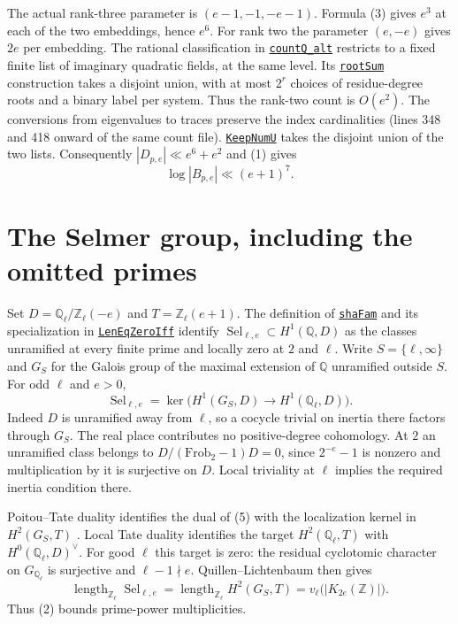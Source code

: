 \documentclass[11pt]{article}
\newcommand{\Z}{\mathbb Z}
\newcommand{\Q}{\mathbb Q}
\newcommand{\len}{\operatorname{length}}
\newcommand{\Sel}{\operatorname{Sel}}
\newcommand{\avref}[2]{\href{run:lean/src/Development/AutomorphicArithmetic/AutomorphicVarieties/#1.lean}{\texttt{#2}}}
\newcommand{\denseref}[2]{\avref{ModularityArgument/ThresholdArguments/DenseThresholdCases/#1}{#2}}
\begin{document}
The actual rank-three parameter is $(e-1,-1,-e-1)$. Formula (3) gives $e^3$
at each of the two embeddings, hence $e^6$. For rank two the parameter
$(e,-e)$ gives $2e$ per embedding. The rational classification in
\denseref{FrobeniusTraceCountBoundOfCmEigensystemCount}{countQ\_alt}
restricts to a fixed finite list of imaginary quadratic fields, at the same
level. Its \avref{GaloisLibrary/CrystallineBaseChange/RootSum}{rootSum}
construction takes a disjoint union, with at most $2^r$ choices of
residue-degree roots and a binary label per system. Thus the rank-two count
is $O(e^2)$. The conversions from eigenvalues to traces preserve the index
cardinalities (lines 348 and 418 onward of the same count file).
\denseref{KeepNumU}{KeepNumU} takes the disjoint union of the two lists.
Consequently $|D_{p,e}|\ll e^6+e^2$ and (1) gives
\[
                   \log|B_{p,e}|\ll(e+1)^7 .
 \tag{4}
\]

\newpage
\section{The Selmer group, including the omitted primes}
Set $D=\Q_\ell/\Z_\ell(-e)$ and $T=\Z_\ell(e+1)$. The definition of
\avref{GaloisLibrary/SelmerTransport/ConjStableShaFam}{shaFam} and its
specialization in \avref{SmallClassNumbers/LenEqZeroIff}{LenEqZeroIff}
identify $\Sel_{\ell,e}\subset H^1(\Q,D)$ as the classes unramified at
every finite prime and locally zero at $2$ and $\ell$. Write
$S=\{\ell,\infty\}$ and $G_S$ for the Galois group of the maximal
extension of $\Q$ unramified outside $S$. For odd $\ell$ and $e>0$,
\[
 \Sel_{\ell,e}=\ker\big(H^1(G_S,D)\longrightarrow H^1(\Q_\ell,D)\big).
 \tag{5}
\]
Indeed $D$ is unramified away from $\ell$, so a cocycle trivial on
inertia there factors through $G_S$. The real place contributes no
positive-degree cohomology. At $2$ an unramified class belongs to
$D/(\mathrm{Frob}_2-1)D=0$, since $2^{-e}-1$ is nonzero and multiplication
by it is surjective on $D$. Local triviality at $\ell$ implies the required
inertia condition there.

Poitou--Tate duality identifies the dual of (5) with the localization kernel
in $H^2(G_S,T)$ \cite[eq.~(22)]{banaszak}. Local Tate duality identifies
the target $H^2(\Q_\ell,T)$ with $H^0(\Q_\ell,D)^\vee$. For good $\ell$
this target is zero: the residual cyclotomic character on $G_{\Q_\ell}$
is surjective and $\ell-1\nmid e$. Quillen--Lichtenbaum then gives
\cite[Thm.~70]{weibel}
\[
       \len_{\Z_\ell}\Sel_{\ell,e}
       =\len_{\Z_\ell}H^2(G_S,T)
       =v_\ell\bigl(|K_{2e}(\Z)|\bigr).
 \tag{6}
\]
Thus (2) bounds prime-power multiplicities.
\end{document}
